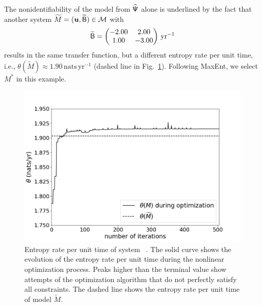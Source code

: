 \documentclass[smallextended]{svjour3}
\makeatletter
\renewcommand*{\eqref}[1]{%
  \hyperref[{#1}]{\textup{\tagform@{\ref*{#1}}}}%
}
\newcommand{\yr}{\mathrm{yr}}
\newcommand{\nats}{\mathrm{nats}}
\newcommand{\ie}{i.e.}
\makeatother
\begin{document}
	The nonidentifiability of the model from $\widehat{\mathsf{\Psi}}$ alone is underlined by the fact that another system $\widetilde{M}=(\vec{u},\widetilde{\tens{B}})\in\mathcal{M}$ with
	\begin{equation*}
		\widetilde{\tens{B}} =
		\begin{pmatrix}
			-2.00 & 2.00 \\ 1.00 & -3.00
		\end{pmatrix}
		\,\yr^{-1}
	\end{equation*}
	results in the same transfer function, but a different entropy rate per unit time, \ie, $\theta(\widetilde{M}) \approx 1.90\,\nats\,\yr^{-1}$ (dashed line in Fig.~\ref{fig:optimization}). Following MaxEnt, we select $M^\ast$ in this example. 
	\begin{figure}[ht]
    \centering
    \includegraphics[width=0.95\linewidth]{figs/optimization.png}
		\caption{Entropy rate per unit time of system~\eqref{eqn:opt_example}. The solid curve shows the evolution of the entropy rate per unit time during the nonlinear optimization process.
		Peaks higher than the terminal value show attempts of the optimization algorithm that do not perfectly satisfy all constraints.
		The dashed line shows the entropy rate per unit time of model $\widetilde{M}$.
		}
		\label{fig:optimization}
\end{figure}
\end{document}

